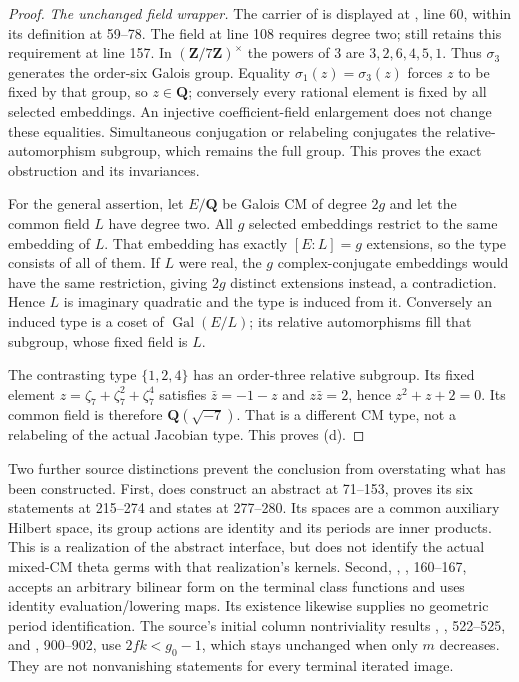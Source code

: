 \documentclass[11pt,a4paper]{article}
\theoremstyle{definition}\newtheorem{remark}[theorem]{Remark}
\begin{document}
\begin{proof}
\textit{The unchanged field wrapper.}
The carrier of  is displayed at
, line 60, within its definition
at 59--78. The field  at line 108 requires degree
two;  still retains this requirement at line 157.
In $(\mathbf Z/7\mathbf Z)^\times$ the powers of $3$ are
$3,2,6,4,5,1$. Thus $\sigma_3$ generates the order-six Galois group.
Equality $\sigma_1(z)=\sigma_3(z)$ forces $z$ to be fixed by that group,
so $z\in\mathbf Q$; conversely every rational element is fixed by all
selected embeddings. An injective coefficient-field enlargement does not
change these equalities. Simultaneous conjugation or relabeling conjugates
the relative-automorphism subgroup, which remains the full group.
This proves the exact obstruction and its invariances.

For the general assertion, let $E/\mathbf Q$ be Galois CM of degree $2g$
and let the common field $L$ have degree two.
All $g$ selected embeddings restrict to the same embedding of $L$.
That embedding has exactly $[E:L]=g$ extensions, so the type consists
of all of them.
If $L$ were real, the $g$ complex-conjugate embeddings would have the same
restriction, giving $2g$ distinct extensions instead, a contradiction.
Hence $L$ is imaginary quadratic and the type is induced from it.
Conversely an induced type is a coset of $\operatorname{Gal}(E/L)$;
its relative automorphisms fill that subgroup, whose fixed field is $L$.

The contrasting type $\{1,2,4\}$ has an order-three relative subgroup.
Its fixed element $z=\zeta_7+\zeta_7^2+\zeta_7^4$ satisfies
$\bar z=-1-z$ and $z\bar z=2$, hence $z^2+z+2=0$.
Its common field is therefore $\mathbf Q(\sqrt{-7})$.
That is a different CM type, not a relabeling of the actual Jacobian type.
This proves (d).
\end{proof}

Two further source distinctions prevent the conclusion from overstating
what has been constructed.
First, 
does construct an abstract  at 71--153, proves its six
statements at 215--274 and states  at 277--280.
Its spaces are a common auxiliary Hilbert space, its group actions are
identity and its periods are inner products.
This is a realization of the abstract interface, but does not identify
the actual mixed-CM theta germs with that realization's kernels.
Second, , , 160--167,
accepts an arbitrary bilinear form on the terminal class functions and
uses identity evaluation/lowering maps.
Its existence likewise supplies no geometric period identification.
The source's initial column nontriviality results
, , 522--525, and
, 900--902, use $2fk<g_0-1$,
which stays unchanged when only $m$ decreases.
They are not nonvanishing statements for every terminal iterated image.
\end{document}
